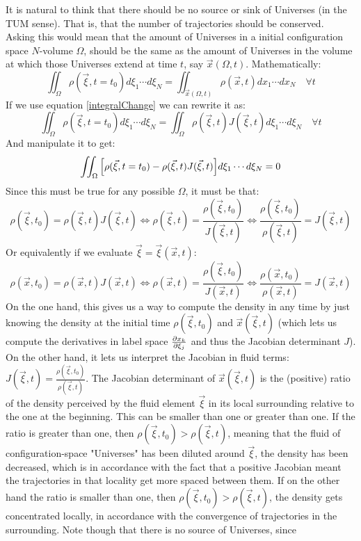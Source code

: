 \documentclass[11pt, a4paper]{article} %
\begin{document}
{It is natural to think that there should be no source or sink of Universes (in the TUM sense). That is, that the number of trajectories should be conserved. Asking this would mean that the amount of Universes in a initial configuration space $N$-volume $\Omega$, should be the same as the amount of Universes in the volume at which those Universes extend at time $t$, say $\vec{x}(\Omega,t)$. Mathematically:
\begin{equation}
\iint_\Omega \rho(\vec{\xi},t=t_0) d\xi_1\cdots d\xi_N=\iint_{\vec{x}(\Omega,t)} \rho(\vec{x},t) dx_1\cdots dx_N\quad \forall t
\end{equation}
If we use equation \eqref{integralChange} we can rewrite it as:
\begin{equation}
\iint_\Omega \rho(\vec{\xi},t=t_0) d\xi_1\cdots d\xi_N=\iint_{\Omega} \rho(\vec{\xi},t) J(\vec{\xi},t) d\xi_1\cdots d\xi_N \quad \forall t
\end{equation}
And manipulate it to get:
\begin{equation}
\iint_\Omega \qty[ \rho(\vec{\xi},t=t_0) -\rho(\vec{\xi},t) J(\vec{\xi},t) ]d\xi_1\cdots d\xi_N=0
\end{equation}
Since this must be true for any possible $\Omega$, it must be that:
\begin{equation}
\rho(\vec{\xi},t_0) = \rho(\vec{\xi},t) J(\vec{\xi},t)\Longleftrightarrow \rho(\vec{\xi},t)=\frac{\rho(\vec{\xi},t_0)}{J(\vec{\xi},t)}\Longleftrightarrow \frac{\rho(\vec{\xi},t_0)}{\rho(\vec{\xi},t)}=J(\vec{\xi},t)
\end{equation}
Or equivalently if we evaluate $\vec{\xi}=\vec{\xi}(\vec{x},t)$:
\begin{equation}
\rho(\vec{x},t_0) = \rho(\vec{x},t) J(\vec{x},t)\Longleftrightarrow \rho(\vec{x},t)=\frac{\rho(\vec{\xi},t_0)}{J(\vec{x},t)}\Longleftrightarrow \frac{\rho(\vec{x},t_0)}{\rho(\vec{x},t)}=J(\vec{x},t)
\end{equation}
On the one hand, this gives us a way to compute the density in any time by just knowing the density at the initial time $\rho(\vec{\xi},t_0)$ and $\vec{x}(\vec{\xi},t)$ (which lets us compute the derivatives in label space $\pdv{x_k}{\xi_j}$ and thus the Jacobian determinant $J$). On the other hand, it lets us interpret the Jacobian in fluid terms: $J(\vec{\xi},t)=\frac{\rho(\vec{\xi},t_0)}{\rho(\vec{\xi},t)}$. The Jacobian determinant of $\vec	{x}(\vec{\xi},t)$ is the (positive) ratio of the density perceived by the fluid element $\vec{\xi}$ in its local surrounding relative to the one at the beginning. This can be smaller than one or greater than one. If the ratio is greater than one, then $\rho(\vec{\xi},t_0)>\rho(\vec{\xi},t)$, meaning that the fluid of configuration-space "Universes" has been diluted around $\vec{\xi}$, the density has been decreased, which is in accordance with the fact that a positive Jacobian meant the trajectories in that locality get more spaced between them. If on the other hand the ratio is smaller than one, then $\rho(\vec{\xi},t_0)>\rho(\vec{\xi},t)$, the density gets concentrated locally, in accordance with the convergence of trajectories in the surrounding. Note though that there is no source of Universes, since}
\end{document}
